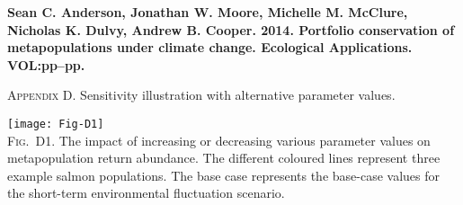 \documentclass[12pt]{article}
\begin{document}
\textbf{Sean C. Anderson, Jonathan W. Moore, Michelle M. McClure, Nicholas K. Dulvy, Andrew B. Cooper. 2014. Portfolio conservation of metapopulations under climate change. Ecological Applications. VOL:pp--pp.}

\bigskip

\textsc{Appendix D.} Sensitivity illustration with alternative parameter values.

\bigskip

\texttt{[image: Fig-D1]}\\
\textsc{Fig.~D1.} The impact of increasing or decreasing various parameter values on metapopulation return abundance. The different coloured lines represent three example salmon populations. The base case represents the base-case values for the short-term environmental fluctuation scenario.
\end{document}
